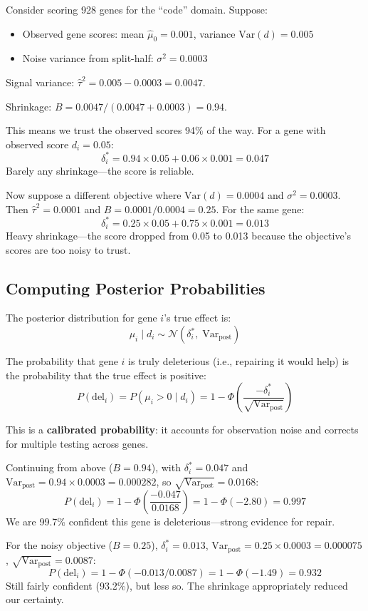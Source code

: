 \documentclass[11pt,letterpaper]{article}
\theoremstyle{definition}
\begin{document}
\begin{tcolorbox}[exbox, title={Worked Example: Shrinkage in Action}]
Consider scoring 928 genes for the ``code'' domain. Suppose:
\begin{itemize}[nosep]
  \item Observed gene scores: mean $\hat{\mu}_0 = 0.001$, variance $\text{Var}(d) = 0.005$
  \item Noise variance from split-half: $\sigma^2 = 0.0003$
\end{itemize}

Signal variance: $\hat{\tau}^2 = 0.005 - 0.0003 = 0.0047$.

Shrinkage: $B = 0.0047 / (0.0047 + 0.0003) = 0.94$.

This means we trust the observed scores 94\% of the way. For a gene with observed score $d_i = 0.05$:
\[
\delta^*_i = 0.94 \times 0.05 + 0.06 \times 0.001 = 0.047
\]
Barely any shrinkage---the score is reliable.

Now suppose a different objective where $\text{Var}(d) = 0.0004$ and $\sigma^2 = 0.0003$. Then $\hat{\tau}^2 = 0.0001$ and $B = 0.0001/0.0004 = 0.25$. For the same gene:
\[
\delta^*_i = 0.25 \times 0.05 + 0.75 \times 0.001 = 0.013
\]
Heavy shrinkage---the score dropped from 0.05 to 0.013 because the objective's scores are too noisy to trust.
\end{tcolorbox}

\subsection{Computing Posterior Probabilities}

The posterior distribution for gene $i$'s true effect is:
\[
\mu_i \mid d_i \sim \mathcal{N}(\delta^*_i, \;\text{Var}_\text{post})
\]

The probability that gene $i$ is truly deleterious (i.e., repairing it would help) is the probability that the true effect is positive:
\begin{equation}
\boxed{P(\text{del}_i) = P(\mu_i > 0 \mid d_i) = 1 - \Phi\!\left(\frac{-\delta^*_i}{\sqrt{\text{Var}_\text{post}}}\right)}
\label{eq:pdel}
\end{equation}

This is a \textbf{calibrated probability}: it accounts for observation noise and corrects for multiple testing across genes.

\begin{tcolorbox}[exbox]
Continuing from above ($B = 0.94$), with $\delta^*_i = 0.047$ and $\text{Var}_\text{post} = 0.94 \times 0.0003 = 0.000282$, so $\sqrt{\text{Var}_\text{post}} = 0.0168$:
\[
P(\text{del}_i) = 1 - \Phi\!\left(\frac{-0.047}{0.0168}\right) = 1 - \Phi(-2.80) = 0.997
\]
We are 99.7\% confident this gene is deleterious---strong evidence for repair.

For the noisy objective ($B = 0.25$), $\delta^*_i = 0.013$, $\text{Var}_\text{post} = 0.25 \times 0.0003 = 0.000075$, $\sqrt{\text{Var}_\text{post}} = 0.0087$:
\[
P(\text{del}_i) = 1 - \Phi(-0.013/0.0087) = 1 - \Phi(-1.49) = 0.932
\]
Still fairly confident (93.2\%), but less so. The shrinkage appropriately reduced our certainty.
\end{tcolorbox}
\end{document}
